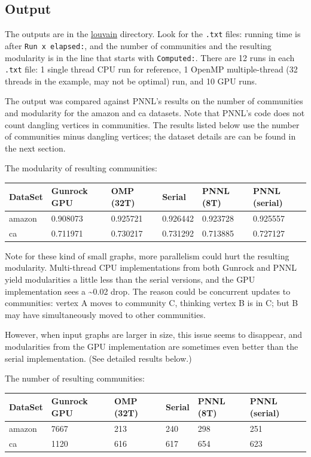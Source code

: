 \documentclass[10pt,oneside]{memoir}
\begin{document}
\hypertarget{output-2}{%
\subsection{Output}\label{output-2}}

The outputs are in the \href{attachments/louvain}{louvain} directory.
Look for the \texttt{.txt} files: running time is after
\texttt{Run\ x\ elapsed:}, and the number of communities and the
resulting modularity is in the line that starts with \texttt{Computed:}.
There are 12 runs in each \texttt{.txt} file: 1 single thread CPU run
for reference, 1 OpenMP multiple-thread (32 threads in the example, may
not be optimal) run, and 10 GPU runs.

The output was compared against PNNL's results on the number of
communities and modularity for the amazon and ca datasets. Note that
PNNL's code does not count dangling vertices in communities. The results
listed below use the number of communities minus dangling vertices; the
dataset details are can be found in the next section.

The modularity of resulting communities:

\begin{longtable}[]{@{}llllll@{}}
\toprule
DataSet & Gunrock GPU & OMP (32T) & Serial & PNNL (8T) & PNNL
(serial)\tabularnewline
\midrule
\endhead
amazon & 0.908073 & 0.925721 & 0.926442 & 0.923728 &
0.925557\tabularnewline
ca & 0.711971 & 0.730217 & 0.731292 & 0.713885 & 0.727127\tabularnewline
\bottomrule
\end{longtable}

Note for these kind of small graphs, more parallelism could hurt the
resulting modularity. Multi-thread CPU implementations from both Gunrock
and PNNL yield modularities a little less than the serial versions, and
the GPU implementation sees a \textasciitilde{}0.02 drop. The reason
could be concurrent updates to communities: vertex A moves to community
C, thinking vertex B is in C; but B may have simultaneously moved to
other communities.

However, when input graphs are larger in size, this issue seems to
disappear, and modularities from the GPU implementation are sometimes
even better than the serial implementation. (See detailed results
below.)

The number of resulting communities:

\begin{longtable}[]{@{}llllll@{}}
\toprule
DataSet & Gunrock GPU & OMP (32T) & Serial & PNNL (8T) & PNNL
(serial)\tabularnewline
\midrule
\endhead
amazon & 7667 & 213 & 240 & 298 & 251\tabularnewline
ca & 1120 & 616 & 617 & 654 & 623\tabularnewline
\bottomrule
\end{longtable}
\end{document}

